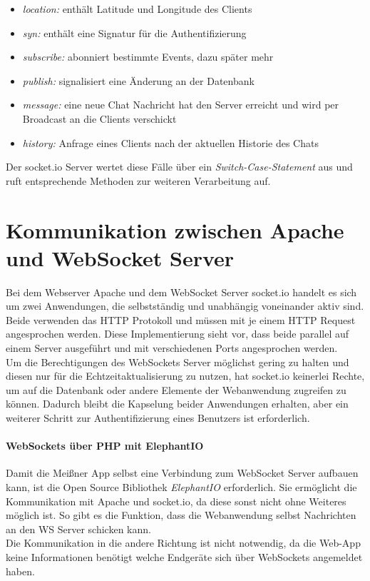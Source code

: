 \begin{itemize}
	\item[] \emph{location:} enthält Latitude und Longitude des Clients
	\item[] \emph{syn:} enthält eine Signatur für die Authentifizierung
	\item[] \emph{subscribe:} abonniert bestimmte Events, dazu später mehr
	\item[] \emph{publish:} signalisiert eine Änderung an der Datenbank
	\item[] \emph{message:} eine neue Chat Nachricht hat den Server erreicht und wird per Broadcast an die Clients verschickt
	\item[] \emph{history:} Anfrage eines Clients nach der aktuellen Historie des Chats
\end{itemize}

Der socket.io Server wertet diese Fälle über ein \emph{Switch-Case-Statement} aus und ruft entsprechende Methoden zur weiteren Verarbeitung auf.

\section{Kommunikation zwischen Apache und WebSocket Server}
Bei dem Webserver Apache und dem WebSocket Server socket.io handelt es sich um zwei Anwendungen, die selbstständig und unabhängig voneinander aktiv sind. Beide verwenden das HTTP Protokoll und müssen mit je einem HTTP Request angesprochen werden. Diese Implementierung sieht vor, dass beide parallel auf einem Server ausgeführt und mit verschiedenen Ports angesprochen werden.\\
Um die Berechtigungen des WebSockets Server möglichst gering zu halten und diesen nur für die Echtzeitaktualisierung zu nutzen, hat socket.io keinerlei Rechte, um auf die Datenbank oder andere Elemente der Webanwendung zugreifen zu können. Dadurch bleibt die Kapselung beider Anwendungen erhalten, aber ein weiterer Schritt zur Authentifizierung eines Benutzers ist erforderlich.

\paragraph{WebSockets über PHP mit ElephantIO}
Damit die Meißner App selbst eine Verbindung zum WebSocket Server aufbauen kann, ist die Open Source Bibliothek \emph{ElephantIO} \cite{elephant.io} erforderlich. Sie ermöglicht die Kommunikation mit Apache und socket.io, da diese sonst nicht ohne Weiteres möglich ist. So gibt es die Funktion, dass die Webanwendung selbst Nachrichten an den WS Server schicken kann.\\
Die Kommunikation in die andere Richtung ist nicht notwendig, da die Web-App keine Informationen benötigt welche Endgeräte sich über WebSockets angemeldet haben.

